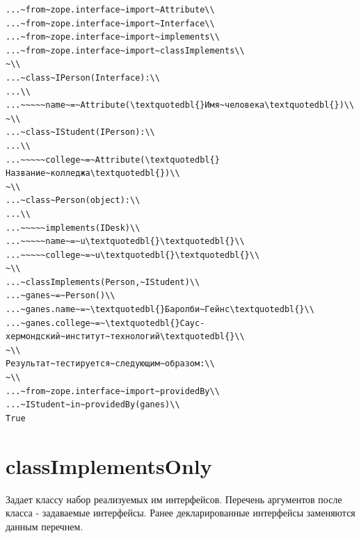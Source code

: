 \documentclass[a4paper,openany,twoside,draft]{book}
\begin{document}
\begin{verbatim}
...~from~zope.interface~import~Attribute\\
...~from~zope.interface~import~Interface\\
...~from~zope.interface~import~implements\\
...~from~zope.interface~import~classImplements\\
~\\
...~class~IPerson(Interface):\\
...\\
...~~~~~name~=~Attribute(\textquotedbl{}Имя~человека\textquotedbl{})\\
~\\
...~class~IStudent(IPerson):\\
...\\
...~~~~~college~=~Attribute(\textquotedbl{}Название~колледжа\textquotedbl{})\\
~\\
...~class~Person(object):\\
...\\
...~~~~~implements(IDesk)\\
...~~~~~name~=~u\textquotedbl{}\textquotedbl{}\\
...~~~~~college~=~u\textquotedbl{}\textquotedbl{}\\
~\\
...~classImplements(Person,~IStudent)\\
...~ganes~=~Person()\\
...~ganes.name~=~\textquotedbl{}Баролби~Гейнс\textquotedbl{}\\
...~ganes.college~=~\textquotedbl{}Саус-хермондский~институт~технологий\textquotedbl{}\\
~\\
Результат~тестируется~следующим~образом:\\
~\\
...~from~zope.interface~import~providedBy\\
...~IStudent~in~providedBy(ganes)\\
True
\end{verbatim}


\section*{classImplementsOnly%
  \label{classimplementsonly}%
}

Задает классу набор реализуемых им интерфейсов.  Перечень аргументов
после класса - задаваемые интерфейсы.  Ранее декларированные
интерфейсы заменяются данным перечнем.
\end{document}
